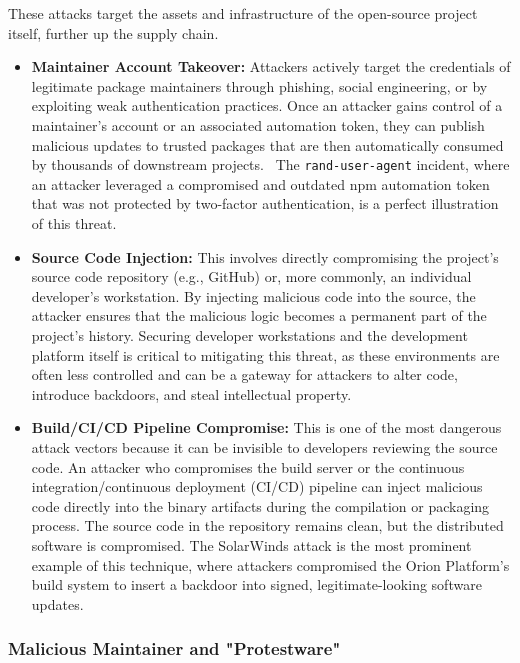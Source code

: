 \documentclass{article}
\begin{document}
These attacks target the assets and infrastructure of the open-source project itself, further up the supply chain.

\begin{itemize}
\item \textbf{Maintainer Account Takeover:} Attackers actively target the credentials of legitimate package maintainers through phishing, social engineering, or by exploiting weak authentication practices. Once an attacker gains control of a maintainer's account or an associated automation token, they can publish malicious updates to trusted packages that are then automatically consumed by thousands of downstream projects.~\cite{ohm2020backstabber} The \lstinline{rand-user-agent} incident, where an attacker leveraged a compromised and outdated npm automation token that was not protected by two-factor authentication, is a perfect illustration of this threat.~\cite{aikido2025rand}
\item \textbf{Source Code Injection:} This involves directly compromising the project's source code repository (e.g., GitHub) or, more commonly, an individual developer's workstation. By injecting malicious code into the source, the attacker ensures that the malicious logic becomes a permanent part of the project's history. Securing developer workstations and the development platform itself is critical to mitigating this threat, as these environments are often less controlled and can be a gateway for attackers to alter code, introduce backdoors, and steal intellectual property.~\cite{ladisa2023sok}
\item \textbf{Build/CI/CD Pipeline Compromise:} This is one of the most dangerous attack vectors because it can be invisible to developers reviewing the source code. An attacker who compromises the build server or the continuous integration/continuous deployment (CI/CD) pipeline can inject malicious code directly into the binary artifacts during the compilation or packaging process. The source code in the repository remains clean, but the distributed software is compromised. The SolarWinds attack is the most prominent example of this technique, where attackers compromised the Orion Platform's build system to insert a backdoor into signed, legitimate-looking software updates.~\cite{cisa2020solarwinds}
\end{itemize}

\subsubsection{Malicious Maintainer and "Protestware"}
\end{document}
